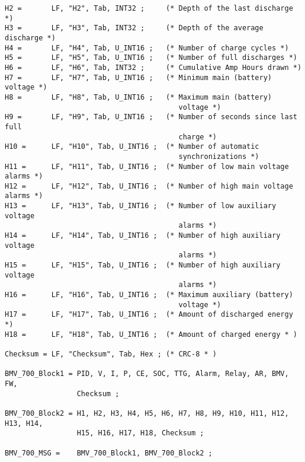 \begin{verbatim}
H2 =       LF, "H2", Tab, INT32 ;     (* Depth of the last discharge *)
H3 =       LF, "H3", Tab, INT32 ;     (* Depth of the average discharge *)
H4 =       LF, "H4", Tab, U_INT16 ;   (* Number of charge cycles *)
H5 =       LF, "H5", Tab, U_INT16 ;   (* Number of full discharges *)
H6 =       LF, "H6", Tab, INT32 ;     (* Cumulative Amp Hours drawn *)
H7 =       LF, "H7", Tab, U_INT16 ;   (* Minimum main (battery) voltage *)
H8 =       LF, "H8", Tab, U_INT16 ;   (* Maximum main (battery) 
                                         voltage *)
H9 =       LF, "H9", Tab, U_INT16 ;   (* Number of seconds since last full
                                         charge *)
H10 =      LF, "H10", Tab, U_INT16 ;  (* Number of automatic 
                                         synchronizations *)
H11 =      LF, "H11", Tab, U_INT16 ;  (* Number of low main voltage alarms *)
H12 =      LF, "H12", Tab, U_INT16 ;  (* Number of high main voltage alarms *)
H13 =      LF, "H13", Tab, U_INT16 ;  (* Number of low auxiliary voltage 
                                         alarms *)
H14 =      LF, "H14", Tab, U_INT16 ;  (* Number of high auxiliary voltage 
                                         alarms *)
H15 =      LF, "H15", Tab, U_INT16 ;  (* Number of high auxiliary voltage 
                                         alarms *)
H16 =      LF, "H16", Tab, U_INT16 ;  (* Maximum auxiliary (battery) 
                                         voltage *)
H17 =      LF, "H17", Tab, U_INT16 ;  (* Amount of discharged energy *)
H18 =      LF, "H18", Tab, U_INT16 ;  (* Amount of charged energy * )

Checksum = LF, "Checksum", Tab, Hex ; (* CRC-8 * )

BMV_700_Block1 = PID, V, I, P, CE, SOC, TTG, Alarm, Relay, AR, BMV, FW, 
                 Checksum ;

BMV_700_Block2 = H1, H2, H3, H4, H5, H6, H7, H8, H9, H10, H11, H12, H13, H14, 
                 H15, H16, H17, H18, Checksum ;

BMV_700_MSG =    BMV_700_Block1, BMV_700_Block2 ;
\end{verbatim}
\newpage


